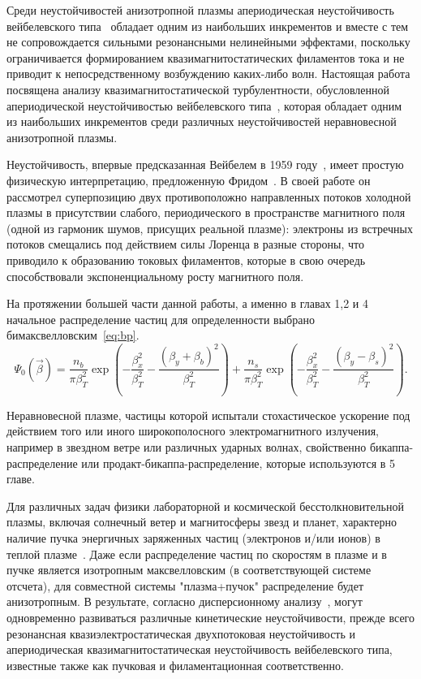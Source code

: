Среди неустойчивостей анизотропной плазмы апериодическая неустойчивость вейбелевского типа~\cite{Weibel1959,Zhou2022,Fried1959,Kalman1968,Morse1971,Kocharovsky2016,Lazar2006,Stockem2009,SchaeferRolffs2006} обладает одним из наибольших инкрементов и вместе с тем не сопровождается сильными резонансными нелинейными эффектами, поскольку ограничивается формированием квазимагнитостатических филаментов тока и не приводит к непосредственному возбуждению каких-либо волн.
Настоящая работа посвящена анализу квазимагнитостатической турбулентности, обусловленной апериодической неустойчивостью вейбелевского типа~\cite{Weibel1959, Fried1959, Kocharovsky2016}, которая обладает одним из наибольших инкрементов среди различных неустойчивостей неравновесной анизотропной плазмы. 

Неустойчивость, впервые предсказанная Вейбелем в 1959 году~\cite{Weibel1959}, имеет простую физическую интерпретацию, предложенную Фридом~\cite{Fried1959}. В своей работе он рассмотрел суперпозицию двух противоположно направленных потоков холодной плазмы в присутствии слабого, периодического в пространстве магнитного поля (одной из гармоник шумов, присущих реальной плазме): электроны из встречных потоков смещались под действием силы Лоренца в разные стороны, что приводило к образованию токовых филаментов, которые в свою очередь способствовали экспоненциальному росту магнитного поля. 

На протяжении большей части данной работы, а именно в главах 1,2 и 4 начальное распределение частиц для определенности выбрано бимаксвелловским~\ref{eq:bp}. 
\begin{equation}
\label{eq:bp}
    \Psi_0(\vec{\beta})=\dfrac{n_b}{\pi\beta_T^2} \exp\left(-\dfrac{\beta_x^2}{\beta_T^2}-\dfrac{\left(\beta_y+\beta_{b}\right)^2}{\beta_T^2}\right)+\dfrac{n_s}{\pi\beta_T^2 } \exp\left(-\dfrac{\beta_x^2}{\beta_T^2}-\dfrac{\left(\beta_y-\beta_{s}\right)^2}{\beta_T^2}\right).  
\end{equation}

Неравновесной плазме, частицы которой испытали стохастическое ускорение под действием того или иного широкополосного электромагнитного излучения, например в звездном ветре или различных ударных волнах, свойственно бикаппа-распределение или продакт-бикаппа-распределение, которые используются в 5 главе.  

Для различных задач физики лабораторной и космической бесстолкновительной плазмы, включая солнечный ветер и магнитосферы звезд и планет, характерно наличие пучка энергичных заряженных частиц (электронов и/или ионов) в теплой плазме~\cite{Gary1993,Treumann1997,Marsch2006}. 
Даже если распределение частиц по скоростям в плазме и в пучке является изотропным максвелловским (в соответствующей системе отсчета), для совместной системы "плазма+пучок" распределение будет анизотропным.  
В результате, согласно дисперсионному анализу~\cite{Mikhailovsky1971,Fried1959,Krall1973,Tzoufras2006,Bret2010}, могут одновременно развиваться различные кинетические неустойчивости, прежде всего резонансная квазиэлектростатическая двухпотоковая неустойчивость и апериодическая квазимагнитостатическая неустойчивость вейбелевского типа, известные также как пучковая и филаментационная соответственно. 


